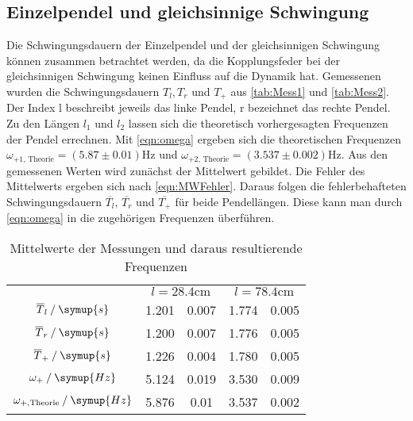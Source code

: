 \subsection{Einzelpendel und gleichsinnige Schwingung}
\label{subsec:Gleichsinnig}
Die Schwingungsdauern der Einzelpendel und der gleichsinnigen Schwingung können zusammen betrachtet werden, da die Kopplungsfeder bei der gleichsinnigen Schwingung 
keinen Einfluss auf die Dynamik hat. Gemessenen wurden die Schwingungsdauern $T_l, T_r$ und $T_+$ aus \autoref{tab:Mess1} und \autoref{tab:Mess2}.
Der Index l beschreibt jeweils das linke Pendel, r bezeichnet das rechte Pendel. Zu den Längen $l_1$ und $l_2$ lassen sich die 
theoretisch vorhergesagten Frequenzen der Pendel errechnen. Mit \autoref{eqn:omega} ergeben sich die theoretischen Frequenzen $\omega_{+1\text{, Theorie}} = (5.87\pm 0.01)\unit{\hertz}$ und 
$\omega_{+2\text{, Theorie}} = (3.537\pm 0.002)\unit{\hertz}$. Aus den gemessenen Werten wird zunächst der Mittelwert gebildet. Die Fehler des Mittelwerts ergeben sich nach \autoref{eqn:MWFehler}.
Daraus folgen die fehlerbehafteten Schwingungsdauern $\overline{T_l}$, $\overline{T_r}$ und $\overline{T_+}$ für beide Pendellängen. Diese kann man durch \autoref{eqn:omega} in 
die zugehörigen Frequenzen überführen.
\begin{table}
    \centering
    \caption{Mittelwerte der Messungen und daraus resultierende Frequenzen}
    \begin{tabular}{c S @{${}\pm{}$} S S @{${}\pm{}$} S}
    \toprule
    &  &  \\
    \cmidrule(lr){2-3}\cmidrule(lr){4-5}
    {$\overline{T}_l \mathbin{/} \symup{s}$}                & 1.201 & 0.007 & 1.774 & 0.005 \\
    {$\overline{T}_r \mathbin{/} \symup{s}$}                & 1.200 & 0.007 & 1.776 & 0.005 \\
    {$\overline{T}_+ \mathbin{/} \symup{s}$}                & 1.226 & 0.004 & 1.780 & 0.005 \\
    {$\omega_+ \mathbin{/} \symup{Hz}$}                     & 5.124 & 0.019 & 3.530 & 0.009 \\
    {$\omega_{+,\text{Theorie}} \mathbin{/} \symup{Hz}$}    & 5.876 & 0.01  & 3.537 & 0.002 \\
    \bottomrule
    \end{tabular}
\end{table}    

